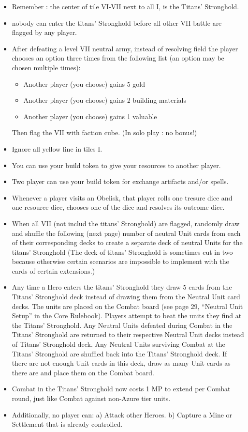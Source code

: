 \begin{itemize}
	\item Remember : the center of tile VI-VII next to all I, is the Titans' Stronghold.
	\item nobody can enter the titans' Stronghold before all other VII battle are flagged by any player.
	\item After defeating a level VII neutral army, instead of resolving field the player chooses an option three times from the following list (an option may be chosen multiple times):
	\begin{itemize}
		\item Another player (you choose) gains 5 gold
		\item Another player (you choose) gains 2 building materials
		\item Another player (you choose) gains 1 valuable
	\end{itemize}
	Then flag the VII with faction cube.
	(In solo play : no bonus!)
	\item Ignore all yellow line in tiles I.
	\item You can use your build token to give your resources to another player.
	\item Two player can use your build token for exchange artifacts and/or spells.
	\item Whenever a player visits an Obelisk, that player rolls one tresure dice and one resource dice, chooses one of the dice and resolves its outcome dice.
	\item When all VII (not includ the titans' Stronghold) are flagged, randomly draw and shuffle the following (next page) number of neutral Unit cards from each of their corresponding decks to create a separate deck of neutral Units for the titans' Stronghold (The deck of titans' Stronghold is sometimes cut in two because otherwise certain scenarios are impossible to implement with the cards of certain extensions.)
	\item Any time a Hero enters the titans' Stronghold they draw 5 cards from the Titans' Stronghold deck instead of drawing them from the Neutral Unit card decks. The units are placed on the Combat board (see page 29, “Neutral Unit Setup” in the Core Rulebook). Players attempt to beat the units they find at the Titans' Stronghold. Any Neutral Units defeated during Combat in the Titans' Stronghold are returned to their respective Neutral Unit decks instead of Titans' Stronghold deck. Any Neutral Units surviving Combat at the Titans' Stronghold are shuffled back into the Titans' Stronghold deck. If there are not enough Unit cards in this deck, draw as many Unit cards as there are and place them on the Combat board.
	\item Combat in the Titans' Stronghold now costs 1 MP to extend per Combat round, just like Combat against non-Azure tier units.
	\item Additionally, no player can:\linebreak
	a) Attack other Heroes.\linebreak
	b) Capture a Mine or Settlement that is already controlled.
\end{itemize}




